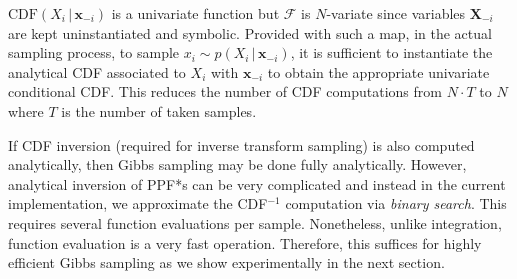 \documentclass[letterpaper]{article}
\newcommand{\bvec}[1]{\textbf{#1}}
\newcommand{\pr}{p}
\begin{document}
$\text{CDF}(X_i  \,|\, \bvec{x}_{-i})$ is a univariate function but 
$\mathcal{F}$ is $N$-variate since variables $\bvec{X}_{-i}$ are kept uninstantiated and symbolic.
Provided with such a map, in the actual sampling process, 
to sample $x_i \sim \pr(X_i \,|\, \bvec{x}_{-i})$,
it is sufficient to instantiate the analytical CDF associated to $X_i$ with  
$\bvec{x}_{-i}$ to obtain the appropriate univariate conditional CDF.
This reduces the number of CDF computations from $N\cdot T$ to $N$ where 
$T$ is the number of taken samples.

If CDF inversion (required for inverse transform sampling) is also
computed analytically, then Gibbs sampling may be done fully
analytically.  However, analytical inversion of PPF*s can be very
complicated and instead in the current implementation, we approximate
the CDF$^{-1}$ computation via \emph{binary search}. This requires
several function evaluations per sample. Nonetheless, unlike
integration, function evaluation is a very fast operation. Therefore,
this suffices for highly efficient Gibbs sampling as we show
experimentally in the next section.


\end{document}
